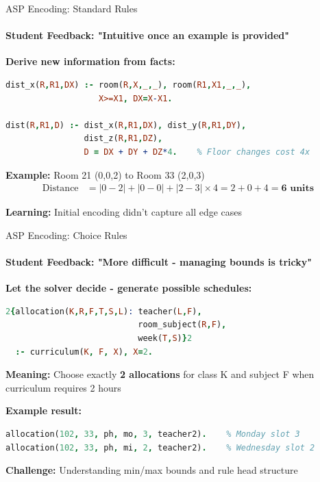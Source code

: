 \documentclass[aspectratio=169]{beamer}
\begin{document}
\begin{frame}[fragile]{ASP Encoding: Standard Rules}
    \framesubtitle{Student Feedback: "Intuitive once an example is provided"}

    \textbf{Derive new information from facts:}

    \begin{lstlisting}[language=Prolog]
% Calculate distance between rooms (Manhattan + floor penalty)
dist_x(R,R1,DX) :- room(R,X,_,_), room(R1,X1,_,_),
                   X>=X1, DX=X-X1.

dist(R,R1,D) :- dist_x(R,R1,DX), dist_y(R,R1,DY),
                dist_z(R,R1,DZ),
                D = DX + DY + DZ*4.    % Floor changes cost 4x
    \end{lstlisting}

    \vspace{0.5cm}

    \textbf{Example:} Room 21 (0,0,2) to Room 33 (2,0,3)
    \begin{align*}
        \text{Distance} &= |0-2| + |0-0| + |2-3| \times 4 = 2 + 0 + 4 = \textbf{6 units}
    \end{align*}

    \textbf{Learning:} Initial encoding didn't capture all edge cases
\end{frame}

\begin{frame}[fragile]{ASP Encoding: Choice Rules}
    \framesubtitle{Student Feedback: "More difficult - managing bounds is tricky"}

    \textbf{Let the solver decide - generate possible schedules:}

    \begin{lstlisting}[language=Prolog]
2{allocation(K,R,F,T,S,L): teacher(L,F),
                           room_subject(R,F),
                           week(T,S)}2
  :- curriculum(K, F, X), X=2.
    \end{lstlisting}

    \vspace{0.5cm}

    \textbf{Meaning:} Choose exactly \textbf{2 allocations} for class K and subject F when curriculum requires 2 hours

    \vspace{0.5cm}

    \textbf{Example result:}
    \begin{lstlisting}[language=Prolog]
allocation(102, 33, ph, mo, 3, teacher2).    % Monday slot 3
allocation(102, 33, ph, mi, 2, teacher2).    % Wednesday slot 2
    \end{lstlisting}

    \textbf{Challenge:} Understanding min/max bounds and rule head structure
\end{frame}
\end{document}
